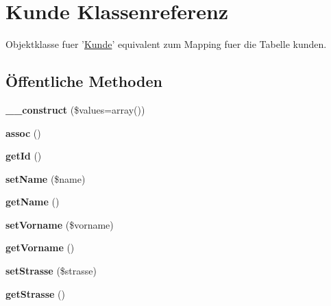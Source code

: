 \hypertarget{classKunde}{\section{\-Kunde \-Klassenreferenz}
\label{classKunde}
}


\-Objektklasse fuer '\hyperlink{classKunde}{\-Kunde}' equivalent zum \-Mapping fuer die \-Tabelle kunden.  


\subsection*{Öffentliche \-Methoden}
\begin{DoxyCompactItemize}
\item 
\hypertarget{classKunde_ad79f2bdfaefd3925e5f9a06806873223}{{\bfseries \-\_\-\-\_\-construct} (\$values=array())}\label{classKunde_ad79f2bdfaefd3925e5f9a06806873223}

\item 
\hypertarget{classKunde_ad0f0c5c3e3f969484954780af94cedc2}{{\bfseries assoc} ()}\label{classKunde_ad0f0c5c3e3f969484954780af94cedc2}

\item 
\hypertarget{classKunde_a64c93a2695191e9b83aa583d909f89fd}{{\bfseries get\-Id} ()}\label{classKunde_a64c93a2695191e9b83aa583d909f89fd}

\item 
\hypertarget{classKunde_a02d8c41eef3f45e88e873eea36b198e6}{{\bfseries set\-Name} (\$name)}\label{classKunde_a02d8c41eef3f45e88e873eea36b198e6}

\item 
\hypertarget{classKunde_a69a219e35fc80e6a5c2f04fc5e864bdb}{{\bfseries get\-Name} ()}\label{classKunde_a69a219e35fc80e6a5c2f04fc5e864bdb}

\item 
\hypertarget{classKunde_aca1e9d8678ff2ed0bcb1ca192facf41e}{{\bfseries set\-Vorname} (\$vorname)}\label{classKunde_aca1e9d8678ff2ed0bcb1ca192facf41e}

\item 
\hypertarget{classKunde_a6bcdc943abc51661e3a6c035f77bac0b}{{\bfseries get\-Vorname} ()}\label{classKunde_a6bcdc943abc51661e3a6c035f77bac0b}

\item 
\hypertarget{classKunde_aafd468959389eb5b4990d9757f78d6c6}{{\bfseries set\-Strasse} (\$strasse)}\label{classKunde_aafd468959389eb5b4990d9757f78d6c6}

\item 
\hypertarget{classKunde_aa1e2491213b83e4c6682cbcd1b07dd72}{{\bfseries get\-Strasse} ()}\label{classKunde_aa1e2491213b83e4c6682cbcd1b07dd72}


\end{DoxyCompactItemize}

